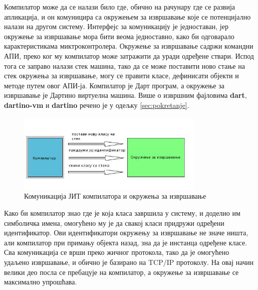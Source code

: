 \documentclass[12pt,oneside]{memoir}
\begin{document}
Компилатор може да се налази било где, обично на рачунару где се развија апликација, и он комуницира са окружењем за извршавање које се потенцијално налази на другом систему. Интерфејс за комуникацију је једноставан, јер окружење за извршавање мора бити веома једноставно, како би одговарало карактеристикама миктроконтролера.
Окружење за извршавање садржи командни АПИ, преко ког му компилатор може затражити да уради одређене ствари. Испод тога се заправо налази стек машина, тако да се може поставити ново стање на стек окружења за извршавање, могу се правити класе, дефинисати објекти и методе путем овог АПИ-ја. Компилатор је Дарт програм, а окружење за извршавање је Дартино виртуелна машина. Више о извршним фајловима \textbf{dart}, \textbf{dartino-vm} и \textbf{dartino} речено је у одељку \ref{sec:pokretanje}.

\begin{figure}[!ht]
  \centering
  \includegraphics[width=0.8\textwidth]{compiler.jpg}
  \caption{Комуникација ЈИТ компилатора и окружења за извршавање}
  \label{fig:komunikacija}
\end{figure}

Како би компилатор знао где је која класа завршила у систему, и доделио им симболичка имена, омогућено му је да свакој класи придружи одређени идентификатор. Ови идентификатори окружењу за извршавање не значе ништа, али компилатор при примању објекта назад, зна да је инстанца одређене класе.
Сва комуникација се врши преко жичног протокола, тако да је омогућено удаљено извршавање, и обично је базирано на TCP/IP протоколу. На овај начин велики део посла се пребацује на компилатор, а окружење за извршавање се максимално упрошћава.
\end{document}

